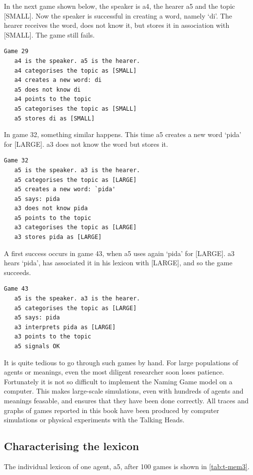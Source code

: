 In the next game shown below, the speaker is 
{\bfshape a4}, the hearer {\bfshape a5} and the topic
{}[SMALL]. Now the speaker is successful in creating a word, namely 
`di'. The hearer receives the word, does not know it,
but stores it in association with [SMALL]. The game still fails. 
\begin{verbatim}
Game 29
   a4 is the speaker. a5 is the hearer. 
   a4 categorises the topic as [SMALL]
   a4 creates a new word: di
   a5 does not know di
   a4 points to the topic
   a5 categorises the topic as [SMALL]
   a5 stores di as [SMALL]
\end{verbatim}
In game 32, something similar happens. This time {\bfshape a5} creates
a new word `pida' for [LARGE]. {\bfshape a3} does not know 
the word but stores it. 
\begin{verbatim}
Game 32
   a5 is the speaker. a3 is the hearer. 
   a5 categorises the topic as [LARGE]
   a5 creates a new word: `pida'
   a5 says: pida
   a3 does not know pida
   a5 points to the topic
   a3 categorises the topic as [LARGE]
   a3 stores pida as [LARGE]
\end{verbatim}
A first success occurs in game 43, when {\bfshape a5} uses again 
`pida' for [LARGE]. {\bfshape a3} hears `pida', has associated it 
in his lexicon with [LARGE], and so the game succeeds. 
\begin{verbatim}
Game 43
   a5 is the speaker. a3 is the hearer. 
   a5 categorises the topic as [LARGE]
   a5 says: pida
   a3 interprets pida as [LARGE]
   a3 points to the topic 
   a5 signals OK
\end{verbatim}
It is quite tedious to go through such games by hand. 
For large populations of agents or meanings, even the 
most diligent researcher soon loses patience. Fortunately 
it is not so difficult to implement the Naming Game model on 
a computer. This makes large-scale simulations, even with 
hundreds of agents and meanings feasable, and ensures
that they have been done correctly.
All traces and graphs of games reported in this book
have been produced by computer simulations or physical 
experiments with the Talking Heads. 

\subsection{Characterising the lexicon}

The individual lexicon of one
agent, {\bfshape a5}, after 100 games is shown in \ref{tab:t-mem3}. 

